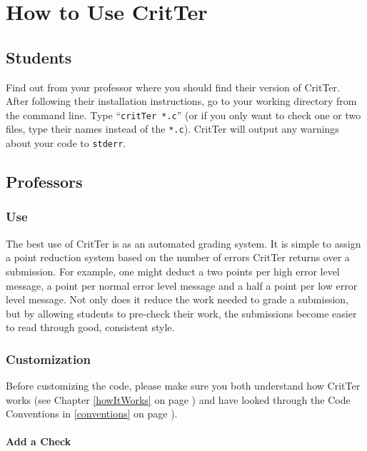 \documentclass[12pt]{report}
\newcommand{\programName}{CritTer\xspace}
\begin{document}
\chapter{How to Use \programName}

\section{Students}
Find out from your professor where you should find their version of \programName. After following their installation instructions, go to your working directory  
from the command line. Type ``\lstinline{critTer *.c}'' (or if you only want to check one or two files, type 
their names instead of the \lstinline{*.c}).  \programName will output 
any warnings about your code to \lstinline{stderr}.

\section{Professors}

\subsection{Use}
The best use of \programName is as an automated grading system. It is simple to assign a point 
reduction system based on the number of errors \programName returns over a submission. For 
example, one might deduct a two points per high error level message, a point per normal error level 
message and a half a point per low error level message. Not only does it reduce the work needed to 
grade a submission, but by allowing students to pre-check their work, the submissions become easier to 
read through good, consistent style.

\subsection{Customization}
Before customizing the code, please make sure you both understand how \programName works (see 
Chapter \ref{howItWorks} on page \pageref{howItWorks}) and have looked through the Code 
Conventions in \autoref{conventions} on page \pageref{conventions}).

\subsubsection{Add a Check}
\end{document}
